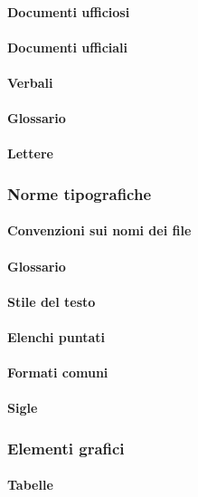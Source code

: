 			\paragraph{Documenti ufficiosi}
			\paragraph{Documenti ufficiali}
			\paragraph{Verbali}
			\paragraph{Glossario}
			\paragraph{Lettere}					

		\subsubsection{Norme tipografiche}
			\paragraph{Convenzioni sui nomi dei file}
			\paragraph{Glossario}
			\paragraph{Stile del testo}
			\paragraph{Elenchi puntati}
			\paragraph{Formati comuni}
			\paragraph{Sigle}						

		\subsubsection{Elementi grafici}
			\paragraph{Tabelle}
